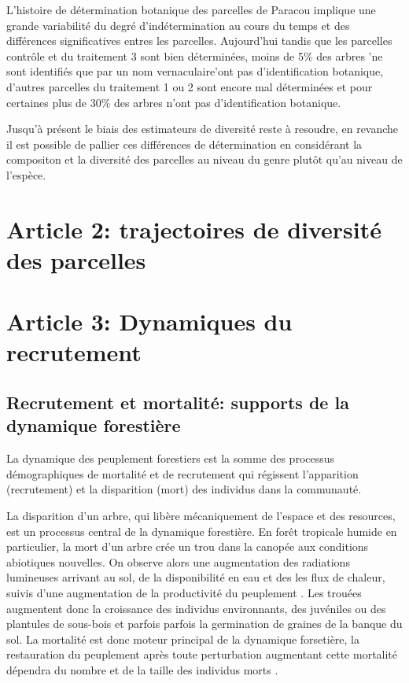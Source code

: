 \documentclass[
  11pt,
  french,
  A4paper,
  extrafontsizes,onecolumn,openright
  ]{memoir}
\begin{document}
L'histoire de détermination botanique des parcelles de Paracou implique
une grande variabilité du degré d'indétermination au cours du temps et
des différences significatives entres les parcelles. Aujourd'hui tandis
que les parcelles contrôle et du traitement 3 sont bien déterminées,
moins de 5\% des arbres 'ne sont identifiés que par un nom
vernaculaire'ont pas d'identification botanique, d'autres parcelles du
traitement 1 ou 2 sont encore mal déterminées et pour certaines plus de
30\% des arbres n'ont pas d'identification botanique.

Jusqu'à présent le biais des estimateurs de diversité reste à resoudre,
en revanche il est possible de pallier ces différences de détermination
en considérant la compositon et la diversité des parcelles au niveau du
genre plutôt qu'au niveau de l'espèce.

\chapter{Article 2: trajectoires de diversité des
parcelles}\label{article-2-trajectoires-de-diversite-des-parcelles}

\chapter{Article 3: Dynamiques du
recrutement}\label{article-3-dynamiques-du-recrutement}

\section{Recrutement et mortalité: supports de la dynamique
forestière}\label{recrutement-et-mortalite-supports-de-la-dynamique-forestiere}

La dynamique des peuplement forestiers est la somme des processus
démographiques de mortalité et de recrutement qui régissent l'apparition
(recrutement) et la disparition (mort) des individus dans la communauté.

La disparition d'un arbre, qui libère mécaniquement de l'espace et des
resources, est un processus central de la dynamique forestière. En forêt
tropicale humide en particulier, la mort d'un arbre crée un trou dans la
canopée aux conditions abiotiques nouvelles. On observe alors une
augmentation des radiations lumineuses arrivant au sol, de la
disponibilité en eau et des les flux de chaleur, suivis d'une
augmentation de la productivité du peuplement \autocite[ in Asner
2004]{Pinard2000}. Les trouées augmentent donc la croissance des
individus environnants, des juvéniles ou des plantules de sous-bois et
parfois parfois la germination de graines de la banque du sol. La
mortalité est donc moteur principal de la dynamique forsetière, la
restauration du peuplement après toute perturbation augmentant cette
mortalité dépendra du nombre et de la taille des individus morts
\autocites{Denslow1980}{Schnitzer2001}{Asner2004}.
\end{document}
